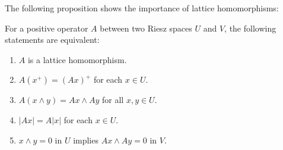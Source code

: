 \documentclass[12pt]{report}
\begin{document}
The following proposition shows the importance of lattice homomorphisms:
\begin{prop}
For a positive operator $A$ between two Riesz spaces $U$ and $V$, the following statements are equivalent:
\begin{enumerate}[\indent(a).]
\item $A$ is a lattice homomorphism.
\item $A(x^+) = (Ax)^+$ for each $x \in U$.
\item $A(x \land y) = Ax \land Ay$ for all $x,y \in U$.
\item $|Ax| = A|x|$ for each $x \in U$.
\item $x\land y = 0$ in $U$ implies $Ax \land Ay = 0$ in $V$. 
\end{enumerate}
\end{prop}


 
 
 
 
\end{document}
